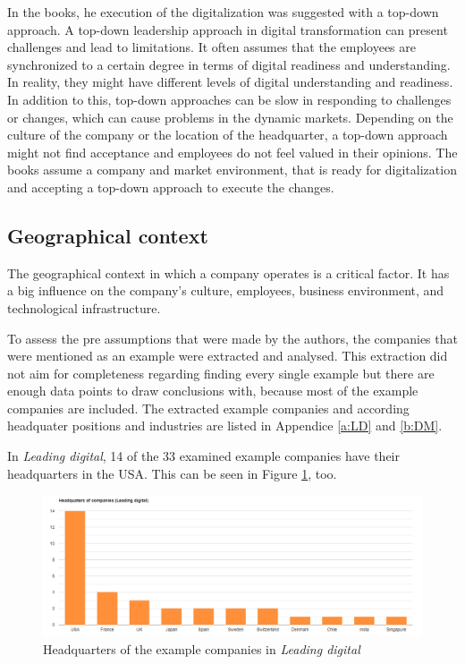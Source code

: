 \documentclass[a4]{scrartcl}
\begin{document}
In the books, he execution of the digitalization was suggested with a top-down approach.
A top-down leadership approach in digital transformation can present challenges and lead to limitations. 
It often assumes that the employees are synchronized to a certain degree in terms of digital readiness and understanding. In reality, they might have different levels of digital understanding and readiness. In addition to this, top-down approaches can be slow in responding to challenges or changes, which can cause problems in the dynamic markets.
Depending on the culture of the company or the location of the headquarter, a top-down approach might not find acceptance and employees do not feel valued in their opinions.
The books assume a company and market environment, that is ready for digitalization and accepting a top-down approach to execute the changes. \cite{digitalmatrix, leadingdigital}







\subsection{Geographical context} \label{subsec:geo_assumptions}

The geographical context in which a company operates is a critical factor. It has a big influence on the company's culture, employees, business environment, and technological infrastructure. 

To assess the pre assumptions that were made by the authors, the companies that were mentioned as an example were extracted and analysed. This extraction did not aim for completeness regarding finding every single example but there are enough data points to draw conclusions with, because most of the example companies are included. The extracted example companies and according headquater positions and industries are listed in Appendice \ref{a:LD} and \ref{b:DM}.

In \textit{Leading digital}, 14 of the 33 examined example companies have their headquarters in the USA. This can be seen in Figure \ref{fig:LD_graph}, too. \cite{leadingdigital}

\begin{figure}[h!]
	\centering
	\includegraphics[width=1\textwidth]{images/LD_graph.png}
	\caption{Headquarters of the example companies in \textit{Leading digital} \cite{leadingdigital}}
	\label{fig:LD_graph}
\end{figure}
\end{document}
